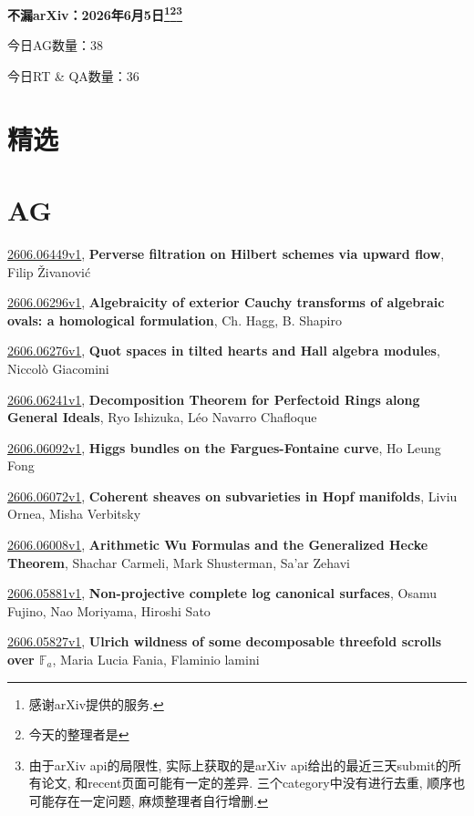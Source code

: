 \documentclass[9pt, a4paper]{article}
\theoremstyle{plain}
\theoremstyle{definition}
\theoremstyle{remark}
\newcommand{\arxiv}[3]{\href{https://arxiv.org/abs/#1}{#1}, \textbf{\textcolor{arxivblue}{#2}}, #3}
\newcommand{\AGnumber}{38}
\newcommand{\RTQAnumber}{36}
\newcommand{\NewestDate}{2026年6月5日}
\newcommand{\todayarXiver}{} %
\begin{document}
\begin{center}
    \Huge\textbf{不漏arXiv：\NewestDate\footnote{感谢arXiv提供的服务.}\footnote{今天的整理者是\todayarXiver}\footnote{由于arXiv api的局限性, 实际上获取的是arXiv api给出的最近三天submit的所有论文, 和recent页面可能有一定的差异. 三个category中没有进行去重, 顺序也可能存在一定问题, 麻烦整理者自行增删.}} \\
\end{center}

\setcounter{section}{-1}

\begin{center}
    今日AG数量：\AGnumber
    
    今日RT \& QA数量：\RTQAnumber
    
\end{center}


\section{精选}


\section{AG}
\arxiv{2606.06449v1}{Perverse filtration on Hilbert schemes via upward flow}{Filip Živanović}

\arxiv{2606.06296v1}{Algebraicity of exterior Cauchy transforms of algebraic ovals: a homological formulation}{Ch. Hagg, B. Shapiro}

\arxiv{2606.06276v1}{Quot spaces in tilted hearts and Hall algebra modules}{Niccolò Giacomini}

\arxiv{2606.06241v1}{Decomposition Theorem for Perfectoid Rings along General Ideals}{Ryo Ishizuka, Léo Navarro Chafloque}

\arxiv{2606.06092v1}{Higgs bundles on the Fargues-Fontaine curve}{Ho Leung Fong}

\arxiv{2606.06072v1}{Coherent sheaves on subvarieties in Hopf manifolds}{Liviu Ornea, Misha Verbitsky}

\arxiv{2606.06008v1}{Arithmetic Wu Formulas and the Generalized Hecke Theorem}{Shachar Carmeli, Mark Shusterman, Sa'ar Zehavi}

\arxiv{2606.05881v1}{Non-projective complete log canonical surfaces}{Osamu Fujino, Nao Moriyama, Hiroshi Sato}

\arxiv{2606.05827v1}{Ulrich wildness of some decomposable threefold scrolls over $\mathbb F_a$}{Maria Lucia Fania, Flaminio lamini}
\end{document}
